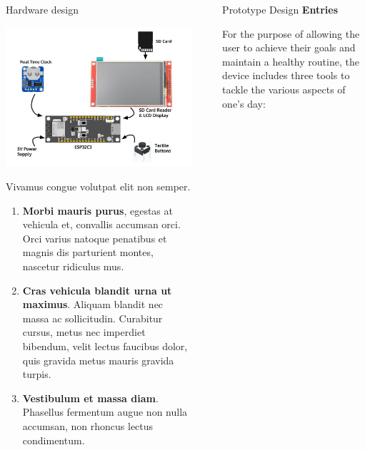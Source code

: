 \documentclass[final]{beamer}
\newlength{\sepwidth}
\newlength{\colwidth}
\newcommand{\separatorcolumn}{\begin{column}{\sepwidth}\end{column}}
\begin{document}
\begin{frame}[t]
\begin{columns}[t]
\begin{column}{\colwidth}
   \begin{block}{Hardware design}
    \begin{center}
      \includegraphics{PrototypeDesign.jpg}
    \end{center}

    Vivamus congue volutpat elit non semper. 

    \begin{enumerate}
      \item \textbf{Morbi mauris purus}, egestas at vehicula et, convallis
        accumsan orci. Orci varius natoque penatibus et magnis dis parturient
        montes, nascetur ridiculus mus.
      \item \textbf{Cras vehicula blandit urna ut maximus}. Aliquam blandit nec
        massa ac sollicitudin. Curabitur cursus, metus nec imperdiet bibendum,
        velit lectus faucibus dolor, quis gravida metus mauris gravida turpis.
      \item \textbf{Vestibulum et massa diam}. Phasellus fermentum augue non
        nulla accumsan, non rhoncus lectus condimentum.
    \end{enumerate}


  \end{block}
\end{column}

\separatorcolumn

\begin{column}{\colwidth}

    \begin{block}{Prototype Design}
    \textbf{Entries}

    For the purpose of allowing the user to achieve their goals and maintain a healthy routine, the device includes three tools to tackle the various aspects of one's day:


\end{block}
\end{column}
\end{columns}
\end{frame}
\end{document}
